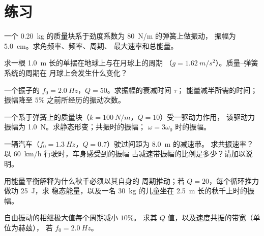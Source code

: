 \section{练习}

\begin{exercise}[$\star$]\label{exo:b1:oscillators-resonance:1}
一个 \qty{0.20}{kg} 的质量块系于劲度系数为 \qty{80}{N/m} 的弹簧上做振动，
振幅为 \qty{5.0}{cm}。求角频率、频率、周期、
最大速率和总能量。
\end{exercise}

\begin{exercise}[$\star$]\label{exo:b1:oscillators-resonance:2}
求一根 \qty{1.0}{m} 长的单摆在地球上与在月球上的周期
（$g = \qty{1.62}{m/s^2}$）。质量–弹簧系统的周期在
月球上会发生什么变化？
\end{exercise}

\begin{exercise}[$\star$]\label{exo:b1:oscillators-resonance:3}
一个振子的 $f_0 = \qty{2.0}{Hz}$，$Q = 50$。求振幅的衰减时间 $\tau$；
能量减半所需的时间；振幅降至
$5\%$ 之前所经历的振动次数。
\end{exercise}

\begin{exercise}[$\star$]\label{exo:b1:oscillators-resonance:4}
一个系于弹簧上的质量块（$k = \qty{100}{N/m}$，$Q = 10$）受一驱动力作用，
该驱动力振幅为 \qty{1.0}{N}。求静态形变；共振时的振幅；
$\omega = 3\omega_0$ 时的振幅。
\end{exercise}

\begin{exercise}[$\star\star$]\label{exo:b1:oscillators-resonance:5}
一辆汽车（$f_0 = \qty{1.3}{Hz}$，$Q = 0.7$）驶过间距为 \qty{8.0}{m} 的减速带。
求共振速率？以 \qty{60}{km/h} 行驶时，车身感受到的振幅
占减速带振幅的比例是多少？请加以说明。
\end{exercise}

\begin{exercise}[$\star\star$]\label{exo:b1:oscillators-resonance:6}
用能量平衡解释为什么秋千必须以其自身的
周期推动；若 $Q = 20$，每个循环推力做功 \qty{25}{J}，求
稳态能量，以及一名 \qty{30}{kg} 的儿童坐在
\qty{2.5}{m} 长的秋千上时的振幅。
\end{exercise}

\begin{exercise}[$\star\star$]\label{exo:b1:oscillators-resonance:7}
自由振动的相继极大值每个周期减小 $10\%$。
求其 $Q$ 值，以及速度共振的带宽（单位为赫兹），
若 $f_0 = \qty{2.0}{Hz}$。
\end{exercise}

